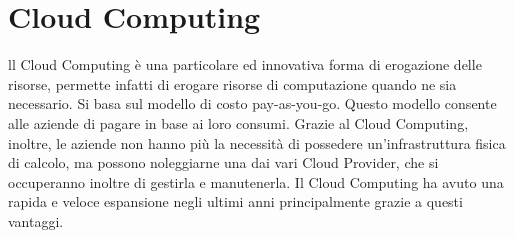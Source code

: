 \section{Cloud Computing}
ll Cloud Computing è una particolare ed innovativa forma di erogazione delle risorse, permette infatti di erogare risorse di computazione quando ne sia necessario.
Si basa sul modello di costo pay-as-you-go.  Questo modello consente alle aziende di pagare in base ai loro consumi.
Grazie al Cloud Computing, inoltre, le aziende non hanno più la necessità di possedere un'infrastruttura fisica di calcolo, ma possono noleggiarne una dai vari Cloud Provider, che si occuperanno inoltre di gestirla e manutenerla.
Il Cloud Computing ha avuto una rapida e veloce espansione negli ultimi anni principalmente grazie a questi vantaggi.



